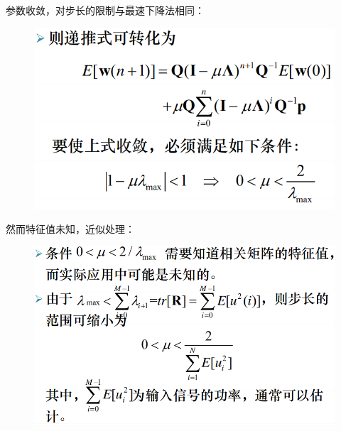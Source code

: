 \documentclass[UTF8]{ctexart} %
\begin{document}
			参数收敛，对步长的限制与最速下降法相同：
			\begin{figure}[H]
				\centering\includegraphics[scale=0.4]{30.png}
			\end{figure}
			然而特征值未知，近似处理：
			\begin{figure}[H]
				\centering\includegraphics[scale=0.4]{31.png}
			\end{figure}
			
\end{document}
